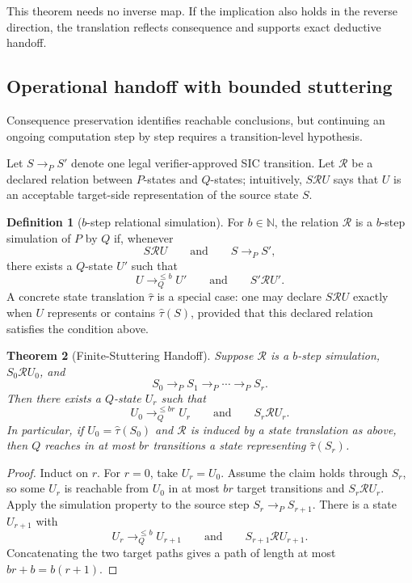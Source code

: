 \documentclass[11pt]{article}
\newtheorem{theorem}{Theorem}[section]
\theoremstyle{definition}
\newtheorem{definition}[theorem]{Definition}
\theoremstyle{remark}
\begin{document}
This theorem needs no inverse map. If the implication also holds in the reverse direction, the translation reflects consequence and supports exact deductive handoff.

\subsection{Operational handoff with bounded stuttering}
Consequence preservation identifies reachable conclusions, but continuing an ongoing computation step by step requires a transition-level hypothesis.

Let $S\to_P S'$ denote one legal verifier-approved SIC transition. Let $\mathcal R$ be a declared relation between $P$-states and $Q$-states; intuitively, $S\mathrel{\mathcal R}U$ says that $U$ is an acceptable target-side representation of the source state $S$.

\begin{definition}[$b$-step relational simulation]
For $b\in\mathbb N$, the relation $\mathcal R$ is a $b$-step simulation of $P$ by $Q$ if, whenever
\[
S\mathrel{\mathcal R}U
\qquad\text{and}\qquad
S\to_P S',
\]
there exists a $Q$-state $U'$ such that
\[
U\to_Q^{\le b}U'
\qquad\text{and}\qquad
S'\mathrel{\mathcal R}U'.
\]
A concrete state translation $\widehat\tau$ is a special case: one may declare $S\mathrel{\mathcal R}U$ exactly when $U$ represents or contains $\widehat\tau(S)$, provided that this declared relation satisfies the condition above.
\end{definition}

\begin{theorem}[Finite-Stuttering Handoff]\label{thm:stutter}
Suppose $\mathcal R$ is a $b$-step simulation, $S_0\mathrel{\mathcal R}U_0$, and
\[
S_0\to_P S_1\to_P\cdots\to_P S_r.
\]
Then there exists a $Q$-state $U_r$ such that
\[
U_0\to_Q^{\le br}U_r
\qquad\text{and}\qquad
S_r\mathrel{\mathcal R}U_r.
\]
In particular, if $U_0=\widehat\tau(S_0)$ and $\mathcal R$ is induced by a state translation as above, then $Q$ reaches in at most $br$ transitions a state representing $\widehat\tau(S_r)$.
\end{theorem}

\begin{proof}
Induct on $r$. For $r=0$, take $U_r=U_0$. Assume the claim holds through $S_r$, so some $U_r$ is reachable from $U_0$ in at most $br$ target transitions and $S_r\mathrel{\mathcal R}U_r$. Apply the simulation property to the source step $S_r\to_P S_{r+1}$. There is a state $U_{r+1}$ with
\[
U_r\to_Q^{\le b}U_{r+1}
\qquad\text{and}\qquad
S_{r+1}\mathrel{\mathcal R}U_{r+1}.
\]
Concatenating the two target paths gives a path of length at most $br+b=b(r+1)$.
\end{proof}
\end{document}
